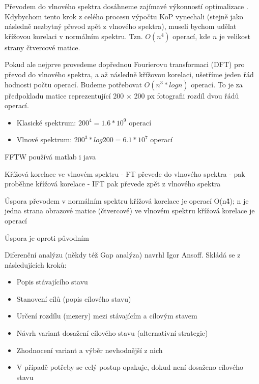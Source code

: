 Převodem do vlnového spektra dosáhneme zajímavé výkonností optimalizace \cite{FFT}. Kdybychom tento krok z celého procesu výpočtu KoP vynechali (stejně jako následně nezbytný převod zpět z vlnového spektra), museli bychom udělat křížovou korelaci v normálním spektru. Tzn. $ O(n^4) $ operací, kde $ n $ je velikost strany čtvercové matice.

Pokud ale nejprve provedeme dopřednou Fourierovu transformaci (DFT) pro převod do vlnového spektra, a až následně křížovou korelaci, ušetříme jeden řád hodnosti počtu operací. Budeme potřebovat $ O(n^3 * logn) $ operací. To je za předpokladu matice reprezentující 200 × 200 px fotografii rozdíl dvou řádů operací.
\begin{itemize}
	\setlength{\parskip}{0pt}
	\setlength{\itemsep}{0pt}
	\item{Klasické spektrum: $ 200^4 = 1.6 * 10^9 $ operací}
	\item{Vlnové spektrum: $ 200^3 * log 200 = 6.1 * 10^7 $ operací}
\end{itemize}


FFTW
používá matlab i java

Křížová korelace ve vlnovém spektru
- FT převede do vlnového spektra
- pak proběhne křížová korelace
- IFT pak převede zpět z vlnového spektra

Úspora převodem 
v normálním spektru křížová korelace je operací O(n\^4); n je jedna strana obrazové matice (čtvercové)
ve vlnovém spektru křížová korelace je operací 

Úspora je oproti původním 


Diferenční analýzu (někdy též Gap analýza) navrhl Igor Ansoff. Skládá se z následujících kroků:
\begin{itemize}
	\setlength{\parskip}{0pt}
	\setlength{\itemsep}{0pt}
	\item{Popis stávajícího stavu}
	\item{Stanovení cílů (popis cílového stavu)}
	\item{Určení rozdílu (mezery) mezi stávajícím a cílovým stavem}
	\item{Návrh variant dosažení cílového stavu (alternativní strategie)}
	\item{Zhodnocení variant a výběr nevhodnější z nich}
	\item{V případě potřeby se celý postup opakuje, dokud není dosaženo cílového stavu}
\end{itemize}

